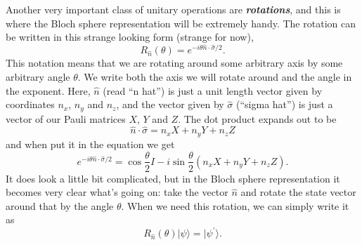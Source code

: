 Another very important class of unitary operations are \textbf{\emph{rotations}}, and this is where the Bloch sphere representation will be extremely handy. The rotation can be written in this strange looking form (strange for now),
\begin{equation}
R_{\hat{n}}(\theta)=e^{-i \theta \hat{n} \cdot \hat{\sigma} / 2}.
\end{equation}
This notation means that we are rotating around some arbitrary axis by some arbitrary angle $\theta$. We write both the axis we will rotate around and the angle in the exponent. Here, $\hat{n}$ (read ``n hat'') is just a unit length vector given by coordinates $n_x$, $n_y$ and $n_z$, and the vector given by $\hat{\sigma}$ (``sigma hat'') is just a vector of our Pauli matrices $X$, $Y$ and $Z$.  The dot product expands out to be
\begin{equation}
      \hat{n} \cdot \hat{\sigma} = n_{x} X+n_{y} Y+n_{z} Z
\end{equation}
and when put it in the equation we get
\begin{equation}
e^{-i \theta \hat{n} \cdot \hat{\sigma} / 2 }=\cos \frac{\theta}{2} I-i \sin \frac{\theta}{2}\left(n_{x} X+n_{y} Y+n_{z} Z\right).
\end{equation}
It does look a little bit complicated, but in the Bloch sphere representation it becomes very clear what's going on: take the vector $\hat{n}$ and rotate the state vector around that by the angle $\theta$. When we need this rotation, we can simply write it as
\begin{equation}
    R_{\hat{n}}(\theta)|\psi\rangle=|\psi^{\prime}\rangle.
\end{equation}




